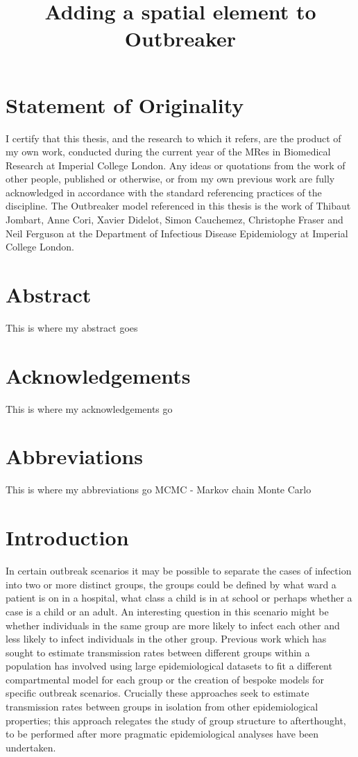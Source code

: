 \documentclass[11pt,a4paper]{report}
\title{Adding a spatial element to Outbreaker}
\begin{document}
\maketitle
\chapter*{Statement of Originality}
\thispagestyle{empty}
\noindent I certify that this thesis, and the research to which it refers, are the product of my own work, conducted during the current year of the MRes in Biomedical Research at Imperial College London. Any ideas or quotations from the work of other people, published or otherwise, or from my own previous work are fully acknowledged in accordance with the standard referencing practices of the discipline. The Outbreaker model referenced in this thesis is the work of Thibaut Jombart, Anne Cori, Xavier Didelot, Simon Cauchemez, Christophe Fraser and Neil Ferguson at the Department of Infectious Disease Epidemiology at Imperial College London.
\newpage

\chapter*{Abstract}
\thispagestyle{empty}
This is where my abstract goes
\newpage

\chapter*{Acknowledgements}
\thispagestyle{empty}
This is where my acknowledgements go
\newpage

\tableofcontents
\pagestyle{plain}
\newpage

\chapter*{Abbreviations}
\thispagestyle{empty}
This is where my abbreviations go
MCMC - Markov chain Monte Carlo
\newpage


\chapter{Introduction}
In certain outbreak scenarios it may be possible to separate the cases of infection into two or more distinct groups, the groups could be defined by what ward a patient is on in a hospital, what class a child is in at school or perhaps whether a case is a child or an adult. An interesting question in this scenario might be whether individuals in the same group are more likely to infect each other and less likely to infect individuals in the other group. Previous work which has sought to estimate transmission rates between different groups within a population has involved using large epidemiological datasets to fit a different compartmental model for each group or the creation of bespoke models for specific outbreak scenarios. Crucially these approaches seek to estimate transmission rates between groups in isolation from other epidemiological properties; this approach relegates the study of group structure to afterthought, to be performed after more pragmatic epidemiological analyses have been undertaken.
\end{document}
